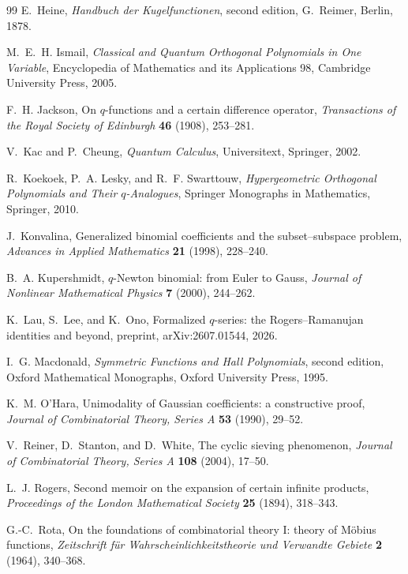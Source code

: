 \documentclass[11pt,oneside,openany]{book}
\theoremstyle{definition}
\theoremstyle{remark}
\begin{document}
\begin{thebibliography}{99}
E.~Heine,
\emph{Handbuch der Kugelfunctionen}, second edition,
G.~Reimer, Berlin, 1878.

M.~E.~H. Ismail,
\emph{Classical and Quantum Orthogonal Polynomials in One Variable},
Encyclopedia of Mathematics and its Applications 98, Cambridge University Press, 2005.

F.~H. Jackson,
On $q$-functions and a certain difference operator,
\emph{Transactions of the Royal Society of Edinburgh} \textbf{46} (1908), 253--281.

V.~Kac and P.~Cheung,
\emph{Quantum Calculus},
Universitext, Springer, 2002.

R.~Koekoek, P.~A. Lesky, and R.~F. Swarttouw,
\emph{Hypergeometric Orthogonal Polynomials and Their $q$-Analogues},
Springer Monographs in Mathematics, Springer, 2010.

J.~Konvalina,
Generalized binomial coefficients and the subset--subspace problem,
\emph{Advances in Applied Mathematics} \textbf{21} (1998), 228--240.

B.~A. Kupershmidt,
$q$-Newton binomial: from Euler to Gauss,
\emph{Journal of Nonlinear Mathematical Physics} \textbf{7} (2000), 244--262.

K.~Lau, S.~Lee, and K.~Ono,
Formalized $q$-series: the Rogers--Ramanujan identities and beyond,
preprint, arXiv:2607.01544, 2026.

I.~G. Macdonald,
\emph{Symmetric Functions and Hall Polynomials}, second edition,
Oxford Mathematical Monographs, Oxford University Press, 1995.

K.~M. O'Hara,
Unimodality of Gaussian coefficients: a constructive proof,
\emph{Journal of Combinatorial Theory, Series A} \textbf{53} (1990), 29--52.

V.~Reiner, D.~Stanton, and D.~White,
The cyclic sieving phenomenon,
\emph{Journal of Combinatorial Theory, Series A} \textbf{108} (2004), 17--50.

L.~J. Rogers,
Second memoir on the expansion of certain infinite products,
\emph{Proceedings of the London Mathematical Society} \textbf{25} (1894), 318--343.

G.-C.~Rota,
On the foundations of combinatorial theory I: theory of M\"obius functions,
\emph{Zeitschrift f\"ur Wahrscheinlichkeitstheorie und Verwandte Gebiete} \textbf{2} (1964), 340--368.


\end{thebibliography}
\end{document}
